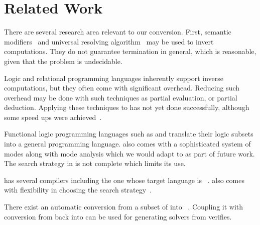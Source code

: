 \section{Related Work}

There are several research area relevant to our conversion.
First, semantic modifiers~\cite{abramov2001standard} and universal resolving algorithm~\cite{abramov2002principles} may be used to invert computations.
They do not guarantee termination in general, which is reasonable, given that the problem is undecidable.

Logic and relational programming languages inherently support inverse computations, but they often come with significant overhead.
Reducing such overhead may be done with such techniques as partial evaluation, or partial deduction.
Applying these techniques to \mk has not yet done successfully, although some speed ups were achieved~\cite{EPTCS341.5}.

Functional logic programming languages such as \curry and \mercury translate their logic subsets into a general programming language.
\mercury also comes with a sophisticated system of modes along with mode analysis which we would adapt to \mk as part of future work.
The search strategy in \mercury is not complete which limits its use.

\curry has several compilers including the one whose target language is \haskell~\cite{brassel2011kics2}.
\curry also comes with flexibility in choosing the search strategy~\cite{hanus2012search}.

There exist an automatic conversion from a subset of \ocaml into \ocanren~\cite{lozov2017typed}.
Coupling it with conversion from \mk back into \ocaml can be used for generating solvers from verifies.


